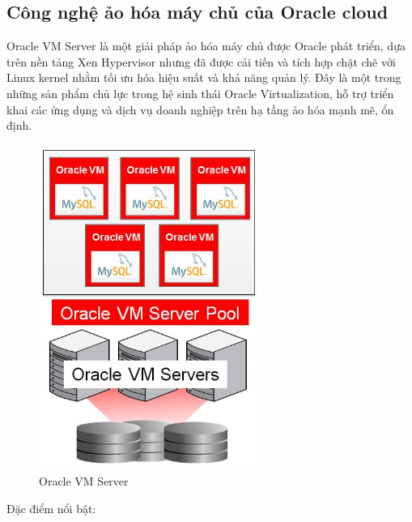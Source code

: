 \subsection{Công nghệ ảo hóa máy chủ của Oracle cloud}
Oracle VM Server là một giải pháp ảo hóa máy chủ được Oracle phát triển, dựa trên nền tảng Xen Hypervisor nhưng đã được cải tiến và tích hợp chặt chẽ với Linux kernel nhằm tối ưu hóa hiệu suất và khả năng quản lý. Đây là một trong những sản phẩm chủ lực trong hệ sinh thái Oracle Virtualization, hỗ trợ triển khai các ứng dụng và dịch vụ doanh nghiệp trên hạ tầng ảo hóa mạnh mẽ, ổn định.

\begin{figure}[H] %
    \centering
    \includegraphics[width=0.65\textwidth]{Oracle_cloud/Oracle_VM_Server.jpg}
    \caption{Oracle VM Server}
    \label{fig:cloud_intro}
\end{figure}

Đặc điểm nổi bật:

